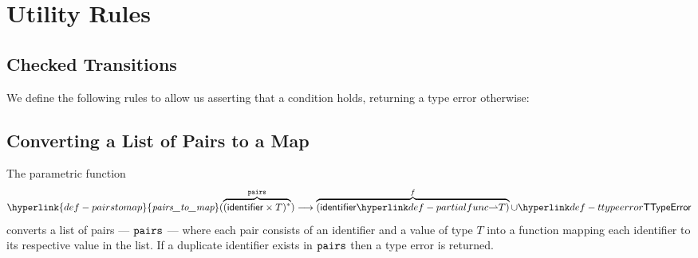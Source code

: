 \documentclass{book}
\newcommand\pairstomap[0]{\hyperlink{def-pairstomap}{\textfunc{pairs\_to\_map}}}
\begin{document}
\chapter{Utility Rules}

\section{Checked Transitions}
\hypertarget{def-checktrans}{}
We define the following rules to allow us asserting that a condition holds,
returning a type error otherwise:

\hypertarget{def-pairstomap}{}
\section{Converting a List of Pairs to a Map \label{sec:PairsToMap}}
The parametric function
\[
  \pairstomap(\overname{(\identifier\times T)^*}{\pairs}) \aslto \overname{(\identifier\partialto T)}{f} \cup \TTypeError
\]
converts a list of pairs --- $\texttt{pairs}$ --- where each pair consists of an identifier and a value
of type $T$ into a function mapping each identifier to its respective value in the list.
If a duplicate identifier exists in $\texttt{pairs}$ then a type error is returned.
\end{document}

